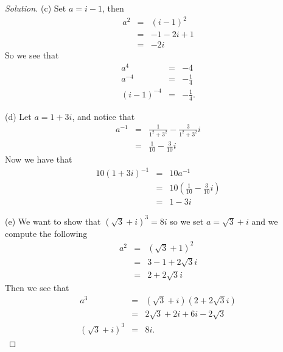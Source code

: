 \documentclass[12pt]{amsart}
\newenvironment{solution}
{\begin{proof}[Solution]}
{\end{proof}}
\begin{document}
\begin{onehalfspace}
\begin{solution}
            (c) Set $a = i - 1$, then
            \begin{eqnarray*}
                a^2 & = & (i-1)^2 \\
                    & = & -1 -2i + 1 \\
                    & = & -2i
            \end{eqnarray*}
            So we see that
            \begin{eqnarray*}
                a^4 & = & -4 \\
                a^{-4} & = & -\frac{1}{4} \\
                (i - 1)^{-4} & = & -\frac{1}{4}.
            \end{eqnarray*}

            (d) Let $a = 1 + 3i$, and notice that
            \begin{eqnarray*}
                a^{-1} & = & \frac{1}{1^2 + 3^2} - \frac{3}{1^2 + 3^2}i \\
                       & = & \frac{1}{10} - \frac{3}{10}i
            \end{eqnarray*}
            Now we have that
            \begin{eqnarray*}
                10(1 + 3i)^{-1} & = & 10a^{-1} \\
                                & = & 10\left(\frac{1}{10} - \frac{3}{10}i\right) \\
                                & = & 1 - 3i
            \end{eqnarray*}

            (e) We want to show that $(\sqrt{3} + i)^3 = 8i$ so we set $a = \sqrt{3} + i$ and we compute the following
            \begin{eqnarray*}
                a^2 & = & (\sqrt{3} + 1)^2 \\
                    & = & 3 - 1 + 2\sqrt{3}i \\
                    & = & 2 + 2\sqrt{3}i
            \end{eqnarray*}
            Then we see that
            \begin{eqnarray*}
                             a^3 & = & (\sqrt{3} + i)(2 + 2\sqrt{3}i) \\
                                 & = & 2\sqrt{3} + 2i + 6i - 2\sqrt{3} \\
                (\sqrt{3} + i)^3 & = & 8i.
            \end{eqnarray*}
        \end{solution}


\end{onehalfspace}
\end{document}
